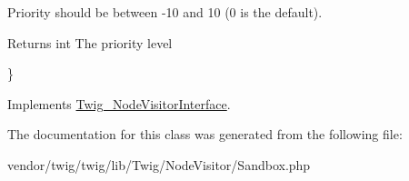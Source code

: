 Priority should be between -\/10 and 10 (0 is the default).

\begin{DoxyReturn}{Returns}
int The priority level
\end{DoxyReturn}
\} 

Implements \hyperlink{interfaceTwig__NodeVisitorInterface_a9ad5ef7f873c47ded2423071fa3218d3}{Twig\+\_\+\+Node\+Visitor\+Interface}.



The documentation for this class was generated from the following file\+:\begin{DoxyCompactItemize}
\item 
vendor/twig/twig/lib/\+Twig/\+Node\+Visitor/Sandbox.\+php\end{DoxyCompactItemize}
